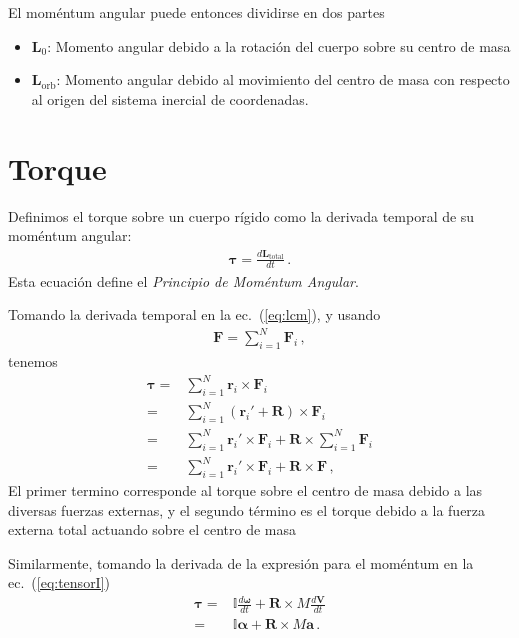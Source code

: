 El moméntum angular puede entonces dividirse en dos partes
\begin{itemize}
\item $\mathbf{L}_0$: Momento angular debido a la rotación del cuerpo sobre su centro de masa
\item $\mathbf{L}_{\text{orb}}$: Momento angular debido al movimiento del centro de masa con respecto al origen del sistema inercial de coordenadas.
\end{itemize}


\section{Torque}

Definimos el torque sobre un cuerpo rígido como la derivada temporal de su moméntum angular:
\begin{align}
  \label{eq:torque}
  \boldsymbol{\tau}=\frac{d\mathbf{L}_{\mathrm{total}}}{dt}\,.
\end{align}
Esta ecuación define el \emph{Principio de Moméntum Angular}. 

Tomando la derivada temporal en la ec.~(\ref{eq:lcm}), y usando
\begin{align}
  \mathbf{F}=\sum_{i=1}^N\mathbf{F}_i\,,
\end{align}
tenemos
\begin{align}
  \boldsymbol{\tau}=&\sum_{i=1}^N\mathbf{r}_i\times \mathbf{F}_i\nonumber\\
=&\sum_{i=1}^N\left(\mathbf{r}_i'+\mathbf{R}\right)\times \mathbf{F}_i\nonumber\\
=&\sum_{i=1}^N\mathbf{r}_i'\times \mathbf{F}_i+\mathbf{R}\times \sum_{i=1}^N\mathbf{F}_i\nonumber\\
=&\sum_{i=1}^N\mathbf{r}_i'\times \mathbf{F}_i+\mathbf{R}\times\mathbf{F}\,,
\end{align}
El primer termino corresponde al torque sobre el centro de masa debido a las diversas fuerzas externas, y el segundo término es el torque debido a la fuerza externa total actuando sobre el centro de masa

Similarmente, tomando la derivada de la expresión para el moméntum en la ec.~(\ref{eq:tensorI})
\begin{align}
  \boldsymbol{\tau}=&\mathbb{I}\frac{d\boldsymbol{\omega}}{dt}+\mathbf{R}\times M\frac{d\mathbf{V}}{dt}\nonumber\\
=&\mathbb{I}\boldsymbol{\alpha}+\mathbf{R}\times M\mathbf{a}\,.
\end{align}




